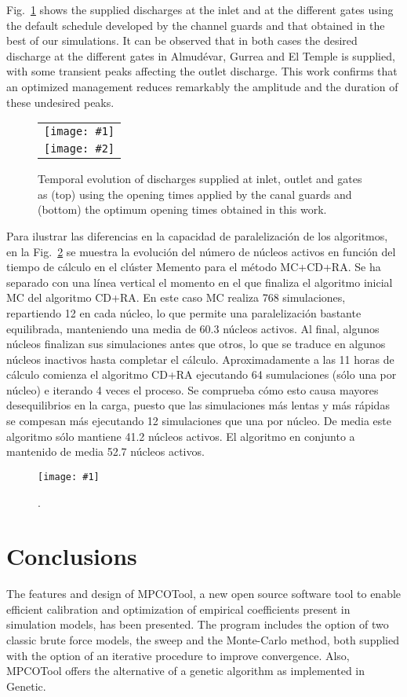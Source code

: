 \documentclass[review,authoryear]{elsarticle}
\newcommand{\FIG}[3]
{
	\begin{figure}[ht!]
		\centering
		\texttt{[image: \#1]}
		\caption{#2.\label{#3}}
	\end{figure}
}
\newcommand{\FIGII}[4]
{
	\begin{figure}[ht!]
		\centering
		\begin{tabular}{c}
			\texttt{[image: \#1]} \\ \texttt{[image: \#2]}
		\end{tabular}
		\caption{#3.\label{#4}}
	\end{figure}
}
\begin{document}
Fig.~\ref{FigSwigs} shows the supplied discharges at the inlet and at the different
gates using the default schedule developed by the channel guards and that 
obtained in the best of our simulations. It can be observed that in both cases 
the desired discharge at the different gates in Almudévar, Gurrea and El Temple is supplied,
with some transient peaks affecting the outlet discharge.
This work confirms that an optimized management reduces remarkably the amplitude and the duration of these undesired peaks.

\FIGII{Violada-contributions.eps}{Violada-optimized-contributions.eps}
{Temporal evolution of discharges supplied at inlet, outlet and gates as (top)
using the opening times applied by the canal guards and (bottom) the optimum
opening times obtained in this work}{FigSwigs}

Para ilustrar las diferencias en la capacidad de paralelización de los
algoritmos, en la Fig.~\ref{FigSwigsLoad} se muestra la evolución del número de
núcleos activos en función del tiempo de cálculo en el clúster Memento para el
método MC+CD+RA. Se ha separado con una línea vertical el momento en el que
finaliza el algoritmo inicial MC del algoritmo CD+RA. En este caso MC realiza
768 simulaciones, repartiendo 12 en cada núcleo, lo que permite una
paralelización bastante equilibrada, manteniendo una media de 60.3 núcleos
activos. Al final, algunos núcleos finalizan sus simulaciones antes que otros,
lo que se traduce en algunos núcleos inactivos hasta completar el cálculo.
Aproximadamente a las 11 horas de cálculo comienza el algoritmo CD+RA ejecutando
64 sumulaciones (sólo una por núcleo) e iterando 4 veces el proceso. Se
comprueba cómo esto causa mayores desequilibrios en la carga, puesto que las
simulaciones más lentas y más rápidas se compesan más ejecutando 12 simulaciones
que una por núcleo. De media este algoritmo sólo mantiene 41.2 núcleos activos.
El algoritmo en conjunto a mantenido de media 52.7 núcleos activos.
\FIG{load-swigs-mc-ra-768-1-64-4.eps}
{}{FigSwigsLoad}

\section{Conclusions}

The features and design of MPCOTool, a new open source software tool to enable efficient calibration and optimization of empirical coefficients present in simulation models, has been presented. The program includes the option of two classic brute force models, the sweep and the Monte-Carlo method, both supplied with the option of an iterative procedure to improve convergence. Also, MPCOTool offers the alternative of a genetic algorithm as implemented in Genetic.
\end{document}
